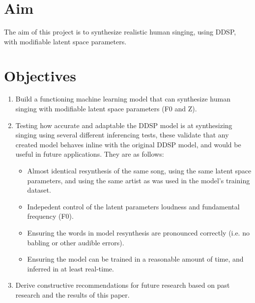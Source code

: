 \section{Aim}

The aim of this project is to synthesize realistic human singing, using DDSP, with modifiable latent space parameters.

\section{Objectives}

\begin{enumerate}
    \item Build a functioning machine learning model that can synthesize human singing with modifiable latent space parameters (F0 and Z).
    \item Testing how accurate and adaptable the DDSP model is at synthesizing singing using several different inferencing tests, these validate that any created model behaves inline with the original DDSP model\cite{OriginalDDSP}, and would be useful in future applications. They are as follows:
    \begin{itemize}
        \item Almost identical resynthesis of the same song, using the same latent space parameters, and using the same artist as was used in the model's training dataset.
        \item Indepedent control of the latent parameters loudness and fundamental frequency (F0).
        \item Ensuring the words in model resynthesis are pronounced correctly (i.e. no babling or other audible errors).
        \item Ensuring the model can be trained in a reasonable amount of time, and inferred in at least real-time.
    \end{itemize}
    \item Derive constructive recommendations for future research based on past research and the results of this paper.
\end{enumerate}